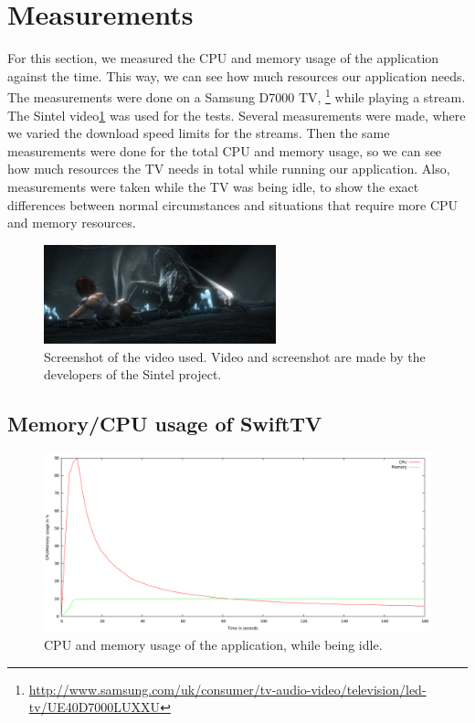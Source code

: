 \section{Measurements}
For this section, we measured the CPU and memory usage of the application against the time.
This way, we can see how much resources our application needs. The measurements were done on a Samsung D7000
TV, \footnote{\url{http://www.samsung.com/uk/consumer/tv-audio-video/television/led-tv/UE40D7000LUXXU}} while playing a stream.
The Sintel video\ref{fig:sintel} was used for the tests. Several measurements were made, where we varied the download speed limits for the streams.
Then the same measurements were done for the total CPU and memory usage, so we can see how much resources the TV needs in total while running
our application. Also, measurements were taken while the TV was being idle, to show the exact differences between normal circumstances and situations
that require more CPU and memory resources.
\clearpage
\begin{center}
\begin{figure}[h!]
	\centering
	\mbox{\includegraphics[width=0.6\textwidth]{Images/sintel.jpg}}
	\caption{Screenshot of the video used. Video and screenshot are made by the developers of the Sintel project.}
	\label{fig:sintel}
\end{figure}
\end{center}

\scalebox{0.6}{

}
\clearpage

\subsection{Memory/CPU usage of SwiftTV}

\begin{center}
\begin{figure}[h]
	\centering
	\mbox{\includegraphics[width=1.2\textwidth]{Images/idle.png}}
	\caption{CPU and memory usage of the application, while being idle.}
	\label{graph:idle}
\end{figure}
\end{center}

